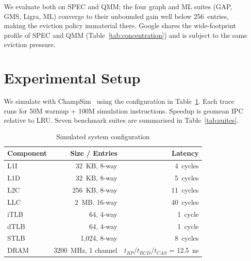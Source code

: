 \documentclass[conference]{IEEEtran}
\newcommand{\lru}{\textsc{LRU}\xspace}
\begin{document}
We evaluate both on SPEC and QMM; the four graph and ML suites (GAP, GMS,
Ligra, ML) converge to their unbounded gain well below 256~entries, making
the eviction policy immaterial there. Google shares the wide-footprint
profile of SPEC and QMM (Table~\ref{tab:concentration}) and is subject to
the same eviction pressure.

\section{Experimental Setup}

We simulate with ChampSim~\cite{champsim} using the configuration in
Table~\ref{tab:config}. Each trace runs for 50M warmup + 100M simulation
instructions. Speedup is geomean IPC relative to \lru.
Seven benchmark suites are summarised in Table~\ref{tab:suites}.

\begin{table}[t!]
\centering
\small
\caption{Simulated system configuration}
\label{tab:config}
\begin{tabular}{lrr}
\toprule
\textbf{Component} & \textbf{Size / Entries} & \textbf{Latency} \\
\midrule
L1I  & 32~KB, 8-way  & 4~cycles \\
L1D  & 32~KB, 8-way  & 5~cycles \\
L2C  & 256~KB, 8-way & 11~cycles \\
LLC  & 2~MB, 16-way  & 40~cycles \\
\midrule
iTLB & 64, 4-way     & 1~cycle \\
dTLB & 64, 4-way     & 1~cycle \\
STLB & 1{,}024, 8-way & 8~cycles \\
\midrule
DRAM & 3200~MHz, 1 channel & $t_{RP}$/$t_{RCD}$/$t_{CAS}$ = 12.5~ns \\
\bottomrule
\end{tabular}
\end{table}
\end{document}
